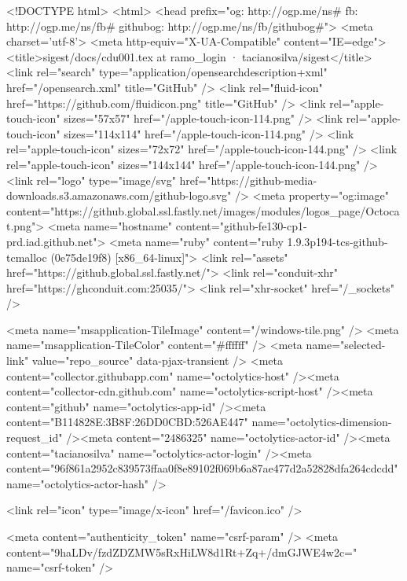 


<!DOCTYPE html>
<html>
  <head prefix="og: http://ogp.me/ns# fb: http://ogp.me/ns/fb# githubog: http://ogp.me/ns/fb/githubog#">
    <meta charset='utf-8'>
    <meta http-equiv="X-UA-Compatible" content="IE=edge">
        <title>sigest/docs/cdu001.tex at ramo_login · tacianosilva/sigest</title>
    <link rel="search" type="application/opensearchdescription+xml" href="/opensearch.xml" title="GitHub" />
    <link rel="fluid-icon" href="https://github.com/fluidicon.png" title="GitHub" />
    <link rel="apple-touch-icon" sizes="57x57" href="/apple-touch-icon-114.png" />
    <link rel="apple-touch-icon" sizes="114x114" href="/apple-touch-icon-114.png" />
    <link rel="apple-touch-icon" sizes="72x72" href="/apple-touch-icon-144.png" />
    <link rel="apple-touch-icon" sizes="144x144" href="/apple-touch-icon-144.png" />
    <link rel="logo" type="image/svg" href="https://github-media-downloads.s3.amazonaws.com/github-logo.svg" />
    <meta property="og:image" content="https://github.global.ssl.fastly.net/images/modules/logos_page/Octocat.png">
    <meta name="hostname" content="github-fe130-cp1-prd.iad.github.net">
    <meta name="ruby" content="ruby 1.9.3p194-tcs-github-tcmalloc (0e75de19f8) [x86_64-linux]">
    <link rel="assets" href="https://github.global.ssl.fastly.net/">
    <link rel="conduit-xhr" href="https://ghconduit.com:25035/">
    <link rel="xhr-socket" href="/_sockets" />
    


    <meta name="msapplication-TileImage" content="/windows-tile.png" />
    <meta name="msapplication-TileColor" content="#ffffff" />
    <meta name="selected-link" value="repo_source" data-pjax-transient />
    <meta content="collector.githubapp.com" name="octolytics-host" /><meta content="collector-cdn.github.com" name="octolytics-script-host" /><meta content="github" name="octolytics-app-id" /><meta content="B114828E:3B8F:26DD0CBD:526AE447" name="octolytics-dimension-request_id" /><meta content="2486325" name="octolytics-actor-id" /><meta content="tacianosilva" name="octolytics-actor-login" /><meta content="96f861a2952c839573ffaa0f8e89102f069b6a87ae477d2a52828dfa264cdcdd" name="octolytics-actor-hash" />
    

    
    
    <link rel="icon" type="image/x-icon" href="/favicon.ico" />

    <meta content="authenticity_token" name="csrf-param" />
<meta content="9haLDv/fzdZDZMW5sRxHiLW8d1Rt+Zq+/dmGJWE4w2c=" name="csrf-token" />

